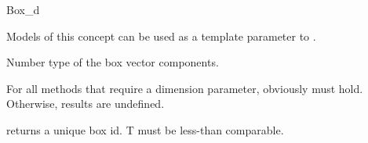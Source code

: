 

\ccRefPageBegin
\begin{ccRefConcept}{Box_d}

\ccDefinition
Models of this concept can be used as a template parameter to .

\ccTypes
{}  {Number type of the box vector components.}

\ccOperations
For all methods that require a dimension parameter, obviously  must hold. Otherwise, results are undefined. 

 {returns a unique box id. T must be less-than comparable.}

\end{ccRefConcept}


\ccRefPageEnd
